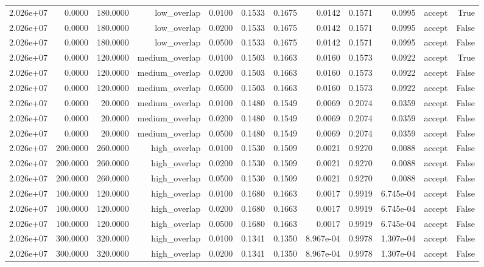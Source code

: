 \begin{table}[t]
\begin{tabular}{lrrrrrrrrrrr}
2.026e+07 & 0.0000 & 180.0000 & low\_overlap & 0.0100 & 0.1533 & 0.1675 & 0.0142 & 0.1571 & 0.0995 & accept & True \\
2.026e+07 & 0.0000 & 180.0000 & low\_overlap & 0.0200 & 0.1533 & 0.1675 & 0.0142 & 0.1571 & 0.0995 & accept & False \\
2.026e+07 & 0.0000 & 180.0000 & low\_overlap & 0.0500 & 0.1533 & 0.1675 & 0.0142 & 0.1571 & 0.0995 & accept & False \\
2.026e+07 & 0.0000 & 120.0000 & medium\_overlap & 0.0100 & 0.1503 & 0.1663 & 0.0160 & 0.1573 & 0.0922 & accept & True \\
2.026e+07 & 0.0000 & 120.0000 & medium\_overlap & 0.0200 & 0.1503 & 0.1663 & 0.0160 & 0.1573 & 0.0922 & accept & False \\
2.026e+07 & 0.0000 & 120.0000 & medium\_overlap & 0.0500 & 0.1503 & 0.1663 & 0.0160 & 0.1573 & 0.0922 & accept & False \\
2.026e+07 & 0.0000 & 20.0000 & medium\_overlap & 0.0100 & 0.1480 & 0.1549 & 0.0069 & 0.2074 & 0.0359 & accept & False \\
2.026e+07 & 0.0000 & 20.0000 & medium\_overlap & 0.0200 & 0.1480 & 0.1549 & 0.0069 & 0.2074 & 0.0359 & accept & False \\
2.026e+07 & 0.0000 & 20.0000 & medium\_overlap & 0.0500 & 0.1480 & 0.1549 & 0.0069 & 0.2074 & 0.0359 & accept & False \\
2.026e+07 & 200.0000 & 260.0000 & high\_overlap & 0.0100 & 0.1530 & 0.1509 & 0.0021 & 0.9270 & 0.0088 & accept & False \\
2.026e+07 & 200.0000 & 260.0000 & high\_overlap & 0.0200 & 0.1530 & 0.1509 & 0.0021 & 0.9270 & 0.0088 & accept & False \\
2.026e+07 & 200.0000 & 260.0000 & high\_overlap & 0.0500 & 0.1530 & 0.1509 & 0.0021 & 0.9270 & 0.0088 & accept & False \\
2.026e+07 & 100.0000 & 120.0000 & high\_overlap & 0.0100 & 0.1680 & 0.1663 & 0.0017 & 0.9919 & 6.745e-04 & accept & False \\
2.026e+07 & 100.0000 & 120.0000 & high\_overlap & 0.0200 & 0.1680 & 0.1663 & 0.0017 & 0.9919 & 6.745e-04 & accept & False \\
2.026e+07 & 100.0000 & 120.0000 & high\_overlap & 0.0500 & 0.1680 & 0.1663 & 0.0017 & 0.9919 & 6.745e-04 & accept & False \\
2.026e+07 & 300.0000 & 320.0000 & high\_overlap & 0.0100 & 0.1341 & 0.1350 & 8.967e-04 & 0.9978 & 1.307e-04 & accept & False \\
2.026e+07 & 300.0000 & 320.0000 & high\_overlap & 0.0200 & 0.1341 & 0.1350 & 8.967e-04 & 0.9978 & 1.307e-04 & accept & False \\

\end{tabular}
\end{table}
